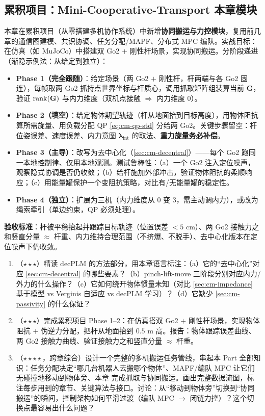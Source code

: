 \subsection{累积项目：Mini-Cooperative-Transport 本章模块}
\label{sec:cm-frontier-project}
本章在累积项目（从零搭建多机协作系统）中新增\textbf{协同搬运与力控模块}，复用前几章的通信图建模、共识协调、任务分配/MAPF、分布式 MPC 编队。实战目标：在仿真（如 MuJoCo）中搭建双 Go2 $+$ 刚性杆场景，实现协同搬运。分阶段递进（渐隐示例法：从给定到独立）：
\begin{itemize}
  \item \textbf{Phase 1（完全跟随）}：给定场景（两 Go2 $+$ 刚性杆，杆两端与各 Go2 固连），每帧取两 Go2 抓持点世界坐标与杆质心，调用抓取矩阵组装算当前 $\mathbf{G}$，验证 $\operatorname{rank}(\mathbf{G})$ 与内力维度（双机点接触 $\Rightarrow$ 内力维度 $0$）。
  \item \textbf{Phase 2（填空）}：给定物体期望轨迹（杆从地面抬到目标高度），用物体阻抗  算所需旋量、用负载分配 QP \cref{eq:cm-qp-std} 分给两 Go2。关键步骤留空：杆位姿误差、速度误差、内力意图 $\boldsymbol{\lambda}_{\text{int}}$ 的取法、\textbf{重力旋量务必补偿}。
  \item \textbf{Phase 3（主导）}：改写为去中心化（\cref{sec:cm-decentral}）——每个 Go2 跑同一本地控制律、仅用本地观测。测试鲁棒性：（a）一个 Go2 注入定位噪声，观察隐式协调是否仍收敛；（b）给杆施加外部冲击，验证物体阻抗的柔顺响应；（c）用能量罐保护一个变阻抗策略，对比有/无能量罐的稳定性。
  \item \textbf{Phase 4（独立）}：扩展为三机（内力维度从 $0$ 变 $3$，需主动调内力），或改为绳索牵引（单边约束，QP 必须处理）。
\end{itemize}
\textbf{验收标准}：杆被平稳抬起并跟踪目标轨迹（位置误差 $<5$ cm）、两 Go2 接触力之和竖直分量 $\approx$ 杆重、内力维持合理范围（不挤爆、不脱手）、去中心化版本在定位噪声下仍收敛。

\begin{practice}
\begin{enumerate}
  \item （$\star\star\star$）精读 decPLM 的方法部分，用本章语言标注：（a）它的“去中心化”对应 \cref{sec:cm-decentral} 的哪些要素？（b）pinch-lift-move 三阶段分别对应内力/外力的什么操作？（c）它如何绕开物体惯量未知（对比 \cref{sec:cm-impedance} 基于模型 vs Verginis 自适应 vs decPLM 学习）？（d）它缺少 \cref{sec:cm-passivity} 的什么保证？
  \item （$\star\star\star$）完成累积项目 Phase 1--2：在仿真搭双 Go2 $+$ 刚性杆场景，实现物体阻抗 $+$ 伪逆力分配，把杆从地面抬到 $0.5$ m 高。报告：物体跟踪误差曲线、两 Go2 接触力曲线、验证接触力之和竖直分量 $\approx$ 杆重。
  \item （$\star\star\star\star$，跨章综合）设计一个完整的多机搬运任务管线，串起本 Part 全部知识：任务分配决定“哪几台机器人去搬哪个物体”、MAPF/编队 MPC 让它们无碰撞地移动到物体旁、本章  完成抓取与协同搬运。画出完整数据流图，标注每步用到的章节、关键算法与接口。讨论：从“移动到物体旁”切换到“协同搬运”的瞬间，控制架构如何平滑过渡（编队 MPC $\to$ 闭链力控）？这个切换点最容易出什么问题？
\end{enumerate}
\end{practice}

